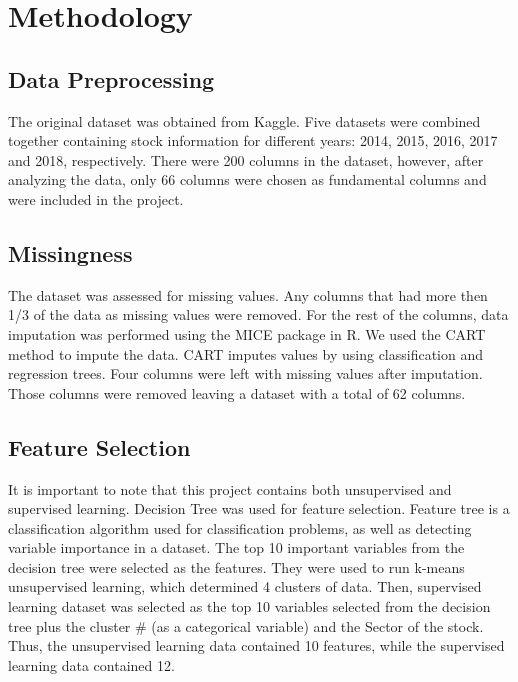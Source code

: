 \documentclass[11pt,]{article}
\begin{document}
\hypertarget{methodology}{%
\section{Methodology}\label{methodology}}

\hypertarget{data-preprocessing}{%
\subsection{Data Preprocessing}\label{data-preprocessing}}

The original dataset was obtained from Kaggle. Five datasets were
combined together containing stock information for different years:
2014, 2015, 2016, 2017 and 2018, respectively. There were 200 columns in
the dataset, however, after analyzing the data, only 66 columns were
chosen as fundamental columns and were included in the project.

\hypertarget{missingness}{%
\subsection{Missingness}\label{missingness}}

The dataset was assessed for missing values. Any columns that had more
then 1/3 of the data as missing values were removed. For the rest of the
columns, data imputation was performed using the MICE package in R. We
used the CART method to impute the data. CART imputes values by using
classification and regression trees. Four columns were left with missing
values after imputation. Those columns were removed leaving a dataset
with a total of 62 columns.

\hypertarget{feature-selection}{%
\subsection{Feature Selection}\label{feature-selection}}

It is important to note that this project contains both unsupervised and
supervised learning. Decision Tree was used for feature selection.
Feature tree is a classification algorithm used for classification
problems, as well as detecting variable importance in a dataset. The top
10 important variables from the decision tree were selected as the
features. They were used to run k-means unsupervised learning, which
determined 4 clusters of data. Then, supervised learning dataset was
selected as the top 10 variables selected from the decision tree plus
the cluster \# (as a categorical variable) and the Sector of the stock.
Thus, the unsupervised learning data contained 10 features, while the
supervised learning data contained 12.
\end{document}
